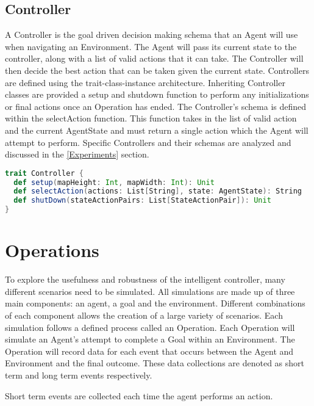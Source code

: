\subsection{Controller}
A Controller is the goal driven decision making schema that an Agent will use when navigating an Environment.
The Agent will pass its current state to the controller, along with a list of valid actions that it can take.
The Controller will then decide the best action that can be taken given the current state.
Controllers are defined using the trait-class-instance architecture.
Inheriting Controller classes are provided a setup and shutdown function to perform any initializations or final actions once an Operation has ended.
The Controller's schema is defined within the selectAction function.
This function takes in the list of valid action and the current AgentState and must return a single action which the Agent will attempt to perform.
Specific Controllers and their schemas are analyzed and discussed in the \ref{Experiments} section.

\begin{lstlisting}[language=Scala]
trait Controller {
  def setup(mapHeight: Int, mapWidth: Int): Unit
  def selectAction(actions: List[String], state: AgentState): String
  def shutDown(stateActionPairs: List[StateActionPair]): Unit
}
\end{lstlisting}



\section{Operations}
To explore the usefulness and robustness of the intelligent controller, many different scenarios need to be simulated.
All simulations are made up of three main components: an agent, a goal and the environment.
Different combinations of each component allows the creation of a large variety of scenarios.
Each simulation follows a defined process called an Operation. 
Each Operation will simulate an Agent's attempt to complete a Goal within an Environment.
The Operation will record data for each event that occurs between the Agent and Environment and the final outcome.
These data collections are denoted as short term and long term events respectively.

Short term events are collected each time the agent performs an action.

